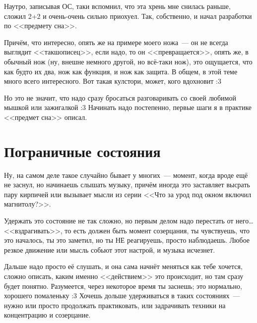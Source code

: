 \documentclass[a5paper,12pt,twoside]{memoir}
\begin{document}
Наутро, записывая ОС, таки вспомнил, что эта хрень мне снилась раньше, сложил 2+2 и очень-очень сильно приохуел. Так, собственно, и начал разработки по <<предмету сна>>.

Причём, что интересно, опять же на примере моего ножа~--- он не всегда выглядит <<такшописец>>, если надо, то он <<превращается>>, опять же, в обычный нож (ну, внешне немного другой, но всё-таки нож), это ощущается, что как будто их два, нож как функция, и нож как защита. В общем, в этой теме много всего интересного. Вот такая кулстори, может, кого вдохновит :3 

Но это не значит, что надо сразу бросаться разговаривать со своей любимой мышкой или зажигалкой :3 Начинать надо постепенно, первые шаги я в практике <<предмет сна>> описал.


\clearpage

\section{Пограничные состояния}

\medskip
Ну, на самом деле такое случайно бывает у многих~--- момент, когда вроде ещё не заснул, но начинаешь слышать музыку, причём иногда это заставляет высрать пару кирпичей или вызывает мысли из серии <<Что за урод под окном включил магнитолу?>>.

Удержать это состояние не так сложно, но первым делом надо перестать от него\ldots <<вздрагивать>>, то есть должен быть момент созерцания, ты чувствуешь,  что это началось, ты это заметил, но ты НЕ реагируешь, просто наблюдаешь. Любое резкое движение или мысль собьют этот настрой, и музыка исчезнет.

Дальше надо просто её слушать, и она сама начнёт меняться как тебе хочется, сложно описать, каким именно <<действием>> это происходит, но там сразу будет понятно. Разумеется, через некоторое время ты заснешь; это нормально, хорошего помаленьку :3 Хочешь дольше удерживаться в таких состояниях~--- нужно или просто продолжать практиковать, или задрачивать техники на концентрацию и созерцание.
 
\end{document}
